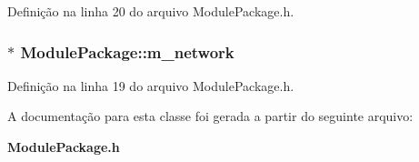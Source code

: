 Definição na linha 20 do arquivo Module\+Package.\+h.

\subsubsection[{m\+\_\+network}]{$\ast$ Module\+Package\+::m\+\_\+network\hspace{0.3cm}{\ttfamily [protected]}}\label{class_module_package_a05633adf8348da546e4aa08c26d19562}


Definição na linha 19 do arquivo Module\+Package.\+h.



A documentação para esta classe foi gerada a partir do seguinte arquivo\+:\begin{DoxyCompactItemize}
\item 
{\bf Module\+Package.\+h}\end{DoxyCompactItemize}
